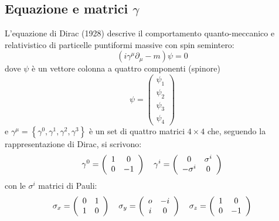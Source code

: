 \documentclass{subnucbo}
\begin{document}
\subsection{Equazione e matrici $\gamma$}
L'equazione di Dirac (1928) descrive il comportamento quanto-meccanico e relativistico di particelle puntiformi massive con spin semintero:
\begin{equation}
        \left( i \gamma ^ { \mu } \partial _ { \mu } - m \right) \psi = 0
        \label{eq:dirac_equation}
\end{equation}
dove $\psi$ è un vettore colonna a quattro componenti (spinore)
\begin{equation}
        \psi = \left( \begin{array} { c } { \psi _ { 1 } } \\ { \psi _ { 2 } } \\ { \psi _ { 3 } } \\ { \psi _ { 4 } } \end{array} \right)
        \label{eq:spinor}
\end{equation}
e $\gamma^{\mu} = \left\{ \gamma ^ { 0 } , \gamma ^ { 1 } , \gamma ^ { 2 } , \gamma ^ { 3 } \right\}$ è un set di quattro matrici $4\times 4$ che, seguendo la rappresentazione di Dirac, si scrivono:
\begin{equation}
        \gamma ^ { 0 } = \left( \begin{array} { c c } { 1 } & { 0 } \\ { 0 } & { - 1 } \end{array} \right) \quad \gamma ^ { i } = \left( \begin{array} { c c } { 0 } & { \sigma ^ { i } } \\ { - \sigma ^ { i } } & { 0 } \end{array} \right)
        \label{eq:gamma_components}
\end{equation}
con le $\sigma^{i}$ matrici di Pauli:
\begin{equation}
        \sigma _ { x } = \left( \begin{array} { c c } { 0 } & { 1 } \\ { 1 } & { 0 } \end{array} \right) \quad \sigma _ { y } = \left( \begin{array} { c c } { o } & { - i } \\ { i } & { 0 } \end{array} \right) \quad \sigma _ { z } = \left( \begin{array} { c c } { 1 } & { 0 } \\ { 0 } & { - 1 } \end{array} \right)
        \label{eq:pauli_matrices}
\end{equation}
\end{document}
